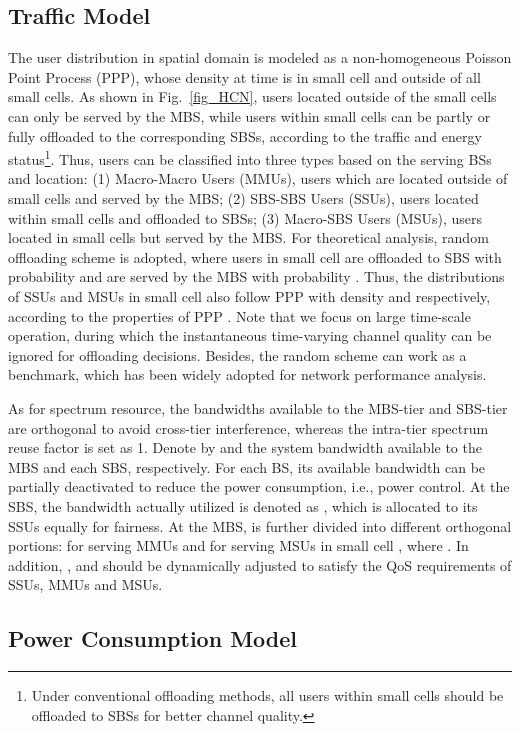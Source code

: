 \documentclass[12pt, draftclsnofoot,onecolumn]{IEEEtran}
\begin{document}
\subsection{Traffic Model}

The user distribution in spatial domain is modeled as a non-homogeneous Poisson Point Process (PPP), whose density at time  is  in small cell  and  outside of all small cells.
As shown in Fig.~\ref{fig_HCN}, users located outside of the small cells can only be served by the MBS, while users within small cells can be partly or fully offloaded to the corresponding SBSs, according to the traffic and energy status\footnote{Under conventional offloading methods, all users within small cells should be offloaded to SBSs for better channel quality.}.
Thus, users can be classified into three types based on the serving BSs and location: (1) Macro-Macro Users (MMUs), users which are located outside of small cells and served by the MBS; (2) SBS-SBS Users (SSUs), users located within small cells and offloaded to SBSs; (3) Macro-SBS Users (MSUs), users located in small cells but served by the MBS.
For theoretical analysis, random offloading scheme is adopted, where users in small cell  are offloaded to SBS with probability  and are served by the MBS with probability .
Thus, the distributions of SSUs and MSUs in small cell  also follow PPP with density  and  respectively, according to the properties of PPP \cite{Stochastic_Geometry}.
Note that we focus on large time-scale operation, during which the instantaneous time-varying channel quality can be ignored for offloading decisions.
Besides, the random scheme can work as a benchmark, which has been widely adopted for network performance analysis.

As for spectrum resource, the bandwidths available to the MBS-tier and SBS-tier are orthogonal to avoid cross-tier interference, whereas the intra-tier spectrum reuse factor is set as 1.
Denote by  and  the system bandwidth available to the MBS and each SBS, respectively.
For each BS, its available bandwidth can be partially deactivated to reduce the power consumption, i.e., power control.
At the SBS, the bandwidth actually utilized is denoted as , which is allocated to its SSUs equally for fairness.
At the MBS,  is further divided into different orthogonal portions:  for serving MMUs and  for serving MSUs in small cell , where .
In addition, ,  and  should be dynamically adjusted to satisfy the QoS requirements of SSUs, MMUs and MSUs.

\subsection{Power Consumption Model}
\end{document}
